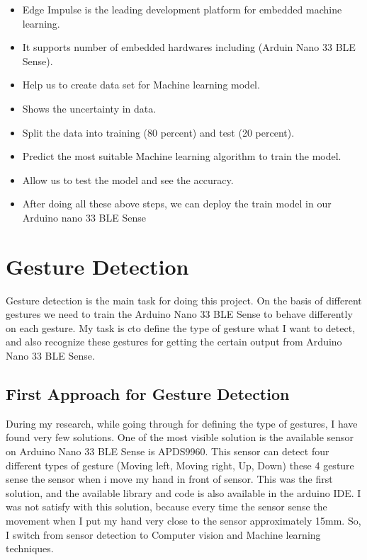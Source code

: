 \begin{itemize}
	\item Edge Impulse is the leading development platform for embedded
	machine learning.
	\item It supports number of embedded hardwares including (Arduin Nano
	33 BLE Sense).
	\item Help us to create data set for Machine learning model.
	\item Shows the uncertainty in data.
	\item Split the data into training (80 percent) and test (20 percent).
	\item Predict the most suitable Machine learning algorithm to train the
	model.
	\item Allow us to test the model and see the accuracy.
	\item After doing all these above steps, we can deploy the train model in
	our Arduino nano 33 BLE Sense
\end{itemize}

\section{Gesture Detection}

Gesture detection is the main task for doing this project. On the basis of different gestures we need to train the Arduino Nano 33 BLE Sense to behave differently on each gesture. My task is cto define the type of gesture what I want to detect, and also recognize these gestures for getting the certain output from Arduino Nano 33 BLE Sense.

\subsection{First Approach for Gesture Detection}

During my research, while going through for defining the type of gestures, I have found very few solutions. One of the most visible solution is the available sensor on Arduino Nano 33 BLE Sense is APDS9960. This sensor can detect four different types of gesture (Moving left, Moving right, Up, Down) these 4 gesture sense the sensor when i move my hand in front of sensor. This was the first solution, and the available library and code is also available in the arduino IDE. I was not satisfy with this solution, because every time the sensor sense the movement when I put my hand very close to the sensor approximately 15mm. So, I switch from sensor detection to Computer vision and Machine learning techniques.

